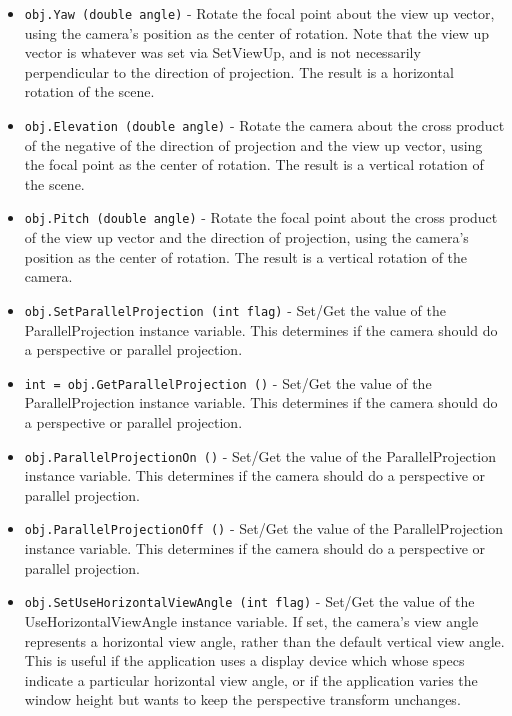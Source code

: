 \begin{itemize}
\item  \verb|obj.Yaw (double angle)| -  Rotate the focal point about the view up vector, using the camera's
 position as the center of rotation. Note that the view up vector is
 whatever was set via SetViewUp, and is not necessarily perpendicular
 to the direction of projection.  The result is a horizontal rotation
 of the scene.

\item  \verb|obj.Elevation (double angle)| -  Rotate the camera about the cross product of the negative of the
 direction of projection and the view up vector, using the focal point
 as the center of rotation.  The result is a vertical rotation of the
 scene.

\item  \verb|obj.Pitch (double angle)| -  Rotate the focal point about the cross product of the view up vector
 and the direction of projection, using the camera's position as the
 center of rotation.  The result is a vertical rotation of the camera.

\item  \verb|obj.SetParallelProjection (int flag)| -  Set/Get the value of the ParallelProjection instance variable. This
 determines if the camera should do a perspective or parallel projection.

\item  \verb|int = obj.GetParallelProjection ()| -  Set/Get the value of the ParallelProjection instance variable. This
 determines if the camera should do a perspective or parallel projection.

\item  \verb|obj.ParallelProjectionOn ()| -  Set/Get the value of the ParallelProjection instance variable. This
 determines if the camera should do a perspective or parallel projection.

\item  \verb|obj.ParallelProjectionOff ()| -  Set/Get the value of the ParallelProjection instance variable. This
 determines if the camera should do a perspective or parallel projection.

\item  \verb|obj.SetUseHorizontalViewAngle (int flag)| -  Set/Get the value of the UseHorizontalViewAngle instance variable. If
 set, the camera's view angle represents a horizontal view angle, rather
 than the default vertical view angle. This is useful if the application
 uses a display device which whose specs indicate a particular horizontal
 view angle, or if the application varies the window height but wants to
 keep the perspective transform unchanges.


\end{itemize}
